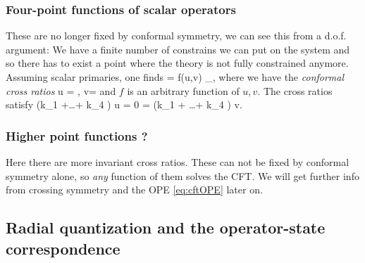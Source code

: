 \subsubsection{Four-point functions of scalar operators}
These are no longer fixed by conformal symmetry, we can see this from a d.o.f. argument: We have a finite number of constrains we can put on the system and so there has to exist a point where the theory is not fully constrained anymore. Assuming scalar primaries, one finds
\be 
\label{eq:cftCorrelatorFourPoint}
 = f(u,v) _{},
\ee 
where we have the \emph{conformal cross ratios}
\bse 
u = , \quad v= 
\ese 
and $f$ is an arbitrary function of $u,v$. The cross ratios satisfy
\bse 
(k_{1\mu} +\dots + k_{4 \mu} ) u = 0 = (k_{1\mu} + \dots + k_{4 \mu} ) v.
\ese

\subsubsection{Higher point functions ?}
Here there are more invariant cross ratios. These can not be fixed by conformal symmetry alone, so \emph{any} function of them solves the CFT. We will get further info from crossing symmetry and the OPE \ref{eq:cftOPE} later on.








\subsection{Radial quantization and the operator-state correspondence} 
